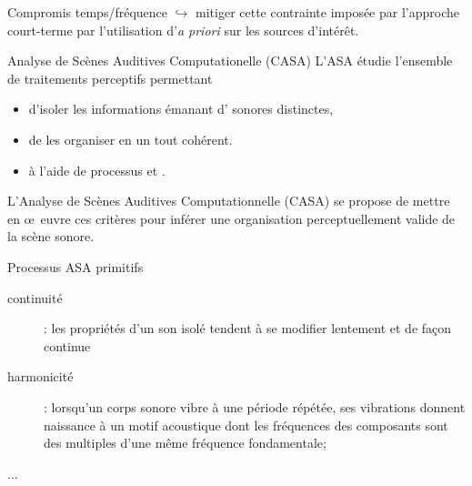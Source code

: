 \begin{frame}{Compromis temps/fréquence}
	$\hookrightarrow{}$ mitiger cette contrainte imposée par l'approche court-terme par l'utilisation d'\alert{\textit{a priori}} sur les sources d'intérêt.
\end{frame}

\begin{frame}{Analyse de Scènes Auditives Computationelle (CASA)}
L'ASA étudie l'ensemble de traitements perceptifs permettant
\begin{itemize}
\item d'isoler les informations émanant d' sonores distinctes,
\item de les organiser en un tout cohérent.
\item à l'aide de processus  et .
\end{itemize}
L'Analyse de Scènes Auditives Computationnelle (CASA) se propose de mettre en \oe~euvre ces critères pour inférer une organisation perceptuellement valide de la scène sonore.
\end{frame}

\begin{frame}{Processus ASA \og primitifs \fg}
\begin{description}
\item[\alert<2>{continuité}] : les propriétés d'un son isolé tendent à se modifier lentement et de façon continue
\item[harmonicité] : lorsqu'un corps sonore vibre à une période répétée, ses vibrations donnent naissance à un motif acoustique dont les fréquences des composants sont des multiples d'une même fréquence fondamentale;
\item[...]
\end{description}
\end{frame}

